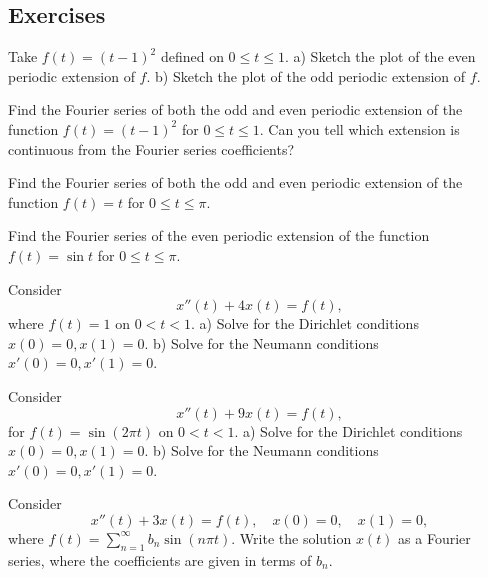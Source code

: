\subsection{Exercises}

\begin{exercise}
Take $f(t) = {(t-1)}^2$ defined on $0 \leq t \leq 1$.
a) Sketch the plot of the even periodic extension of $f$.
b) Sketch the plot of the odd periodic extension of $f$.
\end{exercise}

\begin{exercise}
Find the Fourier series of both the odd and even
periodic extension of 
the function $f(t) = {(t-1)}^2$ for $0 \leq t \leq 1$.
Can you tell which extension is continuous from the Fourier series
coefficients?
\end{exercise}

\begin{exercise}
Find the Fourier series of both the odd and even periodic extension of 
the function $f(t) = t$ for $0 \leq t \leq \pi$.
\end{exercise}

\begin{exercise}
Find the Fourier series of the even periodic extension of 
the function $f(t) = \sin t$ for $0 \leq t \leq \pi$.
\end{exercise}

\begin{exercise}
Consider
\begin{equation*}
x''(t) + 4 x(t) = f(t) ,
\end{equation*}
where $f(t) = 1$ on $0 < t < 1$.
a) Solve for the Dirichlet conditions $x(0)=0, x(1) = 0$.
b) Solve for the Neumann conditions $x'(0)=0, x'(1) = 0$.
\end{exercise}

\begin{exercise}
Consider
\begin{equation*}
x''(t) + 9 x(t) = f(t) ,
\end{equation*}
for $f(t) = \sin (2\pi t)$ on $0 < t < 1$.
a) Solve for the Dirichlet conditions $x(0)=0, x(1) = 0$.
b) Solve for the Neumann conditions $x'(0)=0, x'(1) = 0$.
\end{exercise}

\begin{exercise}
Consider
\begin{equation*}
x''(t) + 3 x(t) = f(t) , \quad x(0) = 0, \quad x(1) = 0,
\end{equation*}
where $f(t) = \sum_{n=1}^\infty b_n \sin (n \pi t)$.  Write the solution $x(t)$
as a Fourier series, where the coefficients are given in terms of $b_n$.
\end{exercise}

